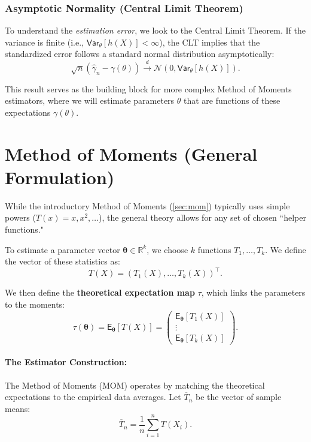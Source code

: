 \subsubsection{Asymptotic Normality (Central Limit Theorem)}
To understand the \textit{estimation error}, we look to the Central Limit Theorem. If the variance is finite (i.e., $\mathsf{Var}_{\theta}[h(X)] < \infty$), the CLT implies that the standardized error follows a standard normal distribution asymptotically:
\[ \sqrt{n}(\hat{\gamma}_n - \gamma(\theta)) \xrightarrow{d} \mathcal{N}(0, \mathsf{Var}_{\theta}[h(X)]). \]

This result serves as the building block for more complex Method of Moments estimators, where we will estimate parameters $\theta$ that are functions of these expectations $\gamma(\theta)$.

\section{Method of Moments (General Formulation)}

While the introductory Method of Moments (\autoref{sec:mom}) typically uses simple powers ($T(x) = x, x^2, \dots$), the general theory allows for any set of chosen ``helper functions."

To estimate a parameter vector $\boldsymbol{\theta} \in \mathbb{R}^k$, we choose $k$ functions $T_1, \dots, T_k$. We define the vector of these statistics as:
\[ T(X) = (T_1(X), \dots, T_k(X))^\top. \]

We then define the \textbf{theoretical expectation map} $\tau$, which links the parameters to the moments:
\[ \tau(\boldsymbol{\theta}) = \mathsf{E}_{\boldsymbol{\theta}}[T(X)] = \begin{pmatrix} \mathsf{E}_{\boldsymbol{\theta}}[T_1(X)] \\ \vdots \\ \mathsf{E}_{\boldsymbol{\theta}}[T_k(X)] \end{pmatrix}. \]

\paragraph{The Estimator Construction:}
The Method of Moments (MOM) operates by matching the theoretical expectations to the empirical data averages. Let $\overline{T}_n$ be the vector of sample means:
\[ \overline{T}_n = \frac{1}{n} \sum_{i=1}^n T(X_i). \]

